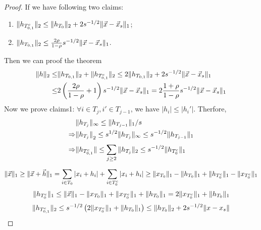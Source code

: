 \begin{theorem}
\begin{proof}
        If we have following two claims:
        \begin{enumerate}
            \item $ \Arrowvert h_{T^c_{0,1}} \Arrowvert_2 \le \Arrowvert h_{T_0} \Arrowvert_2 + 2s^{-1/2} \Arrowvert \vec{x} - \vec{x}_s \Arrowvert_1 $;
                \item $ \Arrowvert h_{T_{0,1}} \Arrowvert_2 \le \frac{2\rho}{1-\rho} s^{-1/2} \Arrowvert \vec{x} - \vec{x}_s \Arrowvert_1 $.
        \end{enumerate}
        Then we can proof the theorem
        \begin{align*}
            \Arrowvert h \Arrowvert_2 \le& \Arrowvert h_{T_{0,1}} \Arrowvert_2 + \Arrowvert h_{T^{c}_{0,1}} \Arrowvert_2 \le 2 \Arrowvert h_{T_{0,1}} \Arrowvert_2 + 2 s^{-1/2} \Arrowvert \vec{x} - \vec{x}_s \Arrowvert_1 \\
            \le& 2 \left( \frac{2\rho}{1 - \rho} + 1 \right) s^{-1/2} \Arrowvert \vec{x} - \vec{x}_s \Arrowvert_1
            = 2 \frac{1 + \rho}{1 - \rho} s ^{-1/2} \Arrowvert \vec{x} - \vec{x}_s \Arrowvert_1
        \end{align*}
        Now we prove claims1:
        $ \forall i \in T_j, i' \in T_{j-1} $, we have $ \left| h_i \right| \le \left| h_i' \right| $. Therfore, 
        \begin{align*}
           &\Arrowvert h_{T_j} \Arrowvert_\infty \le \Arrowvert h_{T_{j-1}} \Arrowvert_1 /s  \\
           \Rightarrow& {\Arrowvert h_{T_j} \Arrowvert}_2 \le s^{1/2} \Arrowvert h_{T_j} \Arrowvert_\infty \le s^{-1/2} \Arrowvert h_{T_{j-1}} \Arrowvert_1 \\
            \Rightarrow& \Arrowvert h_{T^{c}_{0,1}} \Arrowvert\le \sum^{}_{j\ge 2} \Arrowvert h_{T_j} \Arrowvert_2 \le s^{-1/2} \Arrowvert h_{T_0^c} \Arrowvert_1 
        \end{align*}
        \[
            \Arrowvert \vec{x} \Arrowvert_1 \ge \Arrowvert \vec{x} + \vec{h} \Arrowvert_1 = \sum^{}_{i \in T_0} \left| x_i + h_i \right| + \sum^{}_{i \in T^c_{0}} \left| x_i + h_i \right| \ge \Arrowvert x_{T_0} \Arrowvert_1 - \Arrowvert h_{T_0} \Arrowvert_1 + \Arrowvert h_{T^c_{0}} \Arrowvert_1 - \Arrowvert x_{T^c_0} \Arrowvert_1
        \]
        \[
            \Arrowvert h_{T^c_{0}} \Arrowvert_1 \le \Arrowvert \vec{x} \Arrowvert_1 - \Arrowvert x_{T_0} \Arrowvert_1 + \Arrowvert x_{T^c_0} \Arrowvert_1 + \Arrowvert h_{T_0} \Arrowvert_1 = 2 \Arrowvert x_{T^c_0} \Arrowvert_1 + \Arrowvert h_{T_0} \Arrowvert_1
        \]
        \[
            \Arrowvert h_{T^c_{0,1}} \Arrowvert_2 \le s^{-1/2} \left( 2 \Arrowvert x_{T^c_{0}} \Arrowvert_1 + \Arrowvert h_{T_0} \Arrowvert_1 \right) \le \Arrowvert h_{T_0} \Arrowvert_2 + 2s^{-1/2} \Arrowvert x - x_s \Arrowvert
\]
\end{proof}
\end{theorem}
